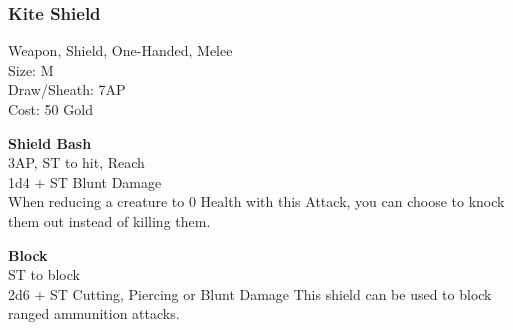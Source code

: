 \subsubsection{Kite Shield}\label{weapon:kiteShield}
Weapon, Shield, One-Handed, Melee\\
Size: M\\
Draw/Sheath: 7AP\\
Cost: 50 Gold

\textbf{Shield Bash}\\
3AP, ST to hit,  Reach\\
1d4 + \texttimes ST Blunt Damage\\
When reducing a creature to 0 Health with this Attack, you can choose to knock them out instead of killing them.

\textbf{Block}\\
ST to block\\
2d6 + \texttimes ST Cutting, Piercing or Blunt Damage
This shield can be used to block ranged ammunition attacks.\\